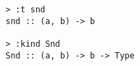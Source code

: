 \begin{repl}\begin{lstlisting}
> :t snd
snd :: (a, b) -> b

> :kind Snd
Snd :: (a, b) -> b -> Type\end{lstlisting}\end{repl}
